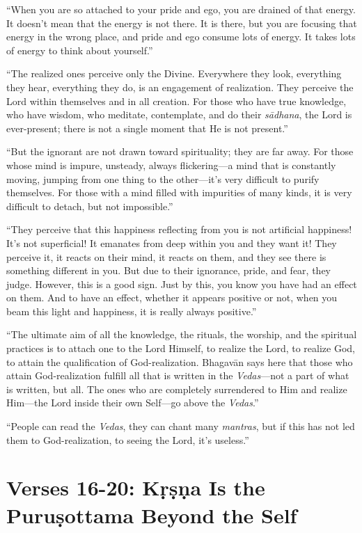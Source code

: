 \enquote{When you are so attached to your pride and ego, you are drained of that energy. It doesn’t mean that the energy is not there. It is there, but you are focusing that energy in the wrong place, and pride and ego consume lots of energy. It takes lots of energy to think about yourself.}

\enquote{The realized ones perceive only the Divine. Everywhere they look, everything they hear, everything they do, is an engagement of realization. They perceive the Lord within themselves and in all creation. For those who have true knowledge, who have wisdom, who meditate, contemplate, and do their \textit{sādhana}, the Lord is ever-present; there is not a single moment that He is not present.}

\enquote{But the ignorant are not drawn toward spirituality; they are far away. For those whose mind is impure, unsteady, always flickering---a mind that is constantly moving, jumping from one thing to the other---it’s very difficult to purify themselves. For those with a mind filled with impurities of many kinds, it is very difficult to detach, but not impossible.}

\enquote{They perceive that this happiness reflecting from you is not artificial happiness! It’s not superficial! It emanates from deep within you and they want it! They perceive it, it reacts on their mind, it reacts on them, and they see there is something different in you. But due to their ignorance, pride, and fear, they judge. However, this is a good sign. Just by this, you know you have had an effect on them. And to have an effect, whether it appears positive or not, when you beam this light and happiness, it is really always positive.}

\enquote{The ultimate aim of all the knowledge, the rituals, the worship, and the spiritual practices is to attach one to the Lord Himself, to realize the Lord, to realize God, to attain the qualification of God-realization. Bhagavān says here that those who attain God-realization fulfill all that is written in the \textit{Vedas}---not a part of what is written, but all. The ones who are completely surrendered to Him and realize Him---the Lord inside their own Self---go above the \textit{Vedas}.}

\enquote{People can read the \textit{Vedas}, they can chant many \textit{mantras}, but if this has not led them to God-realization, to seeing the Lord, it’s useless.}

\section{Verses 16-20: Kṛṣṇa Is the Puruṣottama Beyond the Self}\label{sec-verses-16-20-krsna-is-the-purusottama-beyond-the-self}


